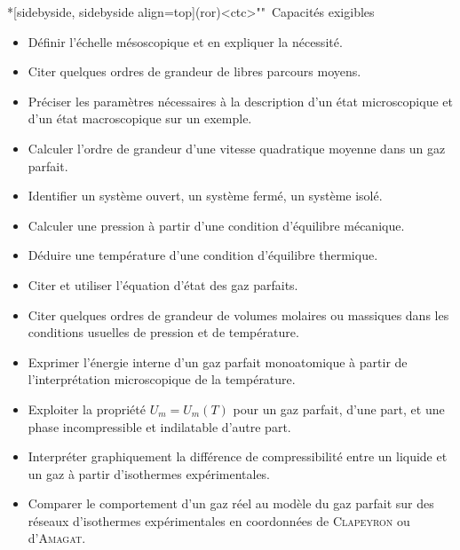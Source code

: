 \documentclass[../../main/main.tex]{subfiles}
\begin{document}
\begin{tcn}*[sidebyside, sidebyside align=top](ror)<ctc>""{\iconhow~Capacités exigibles}
	\small
	\begin{itemize}[label=\rcheck]
		\item Définir l'échelle mésoscopique et en expliquer la nécessité.
		\item Citer quelques ordres de grandeur de libres parcours moyens.
		\item Préciser les paramètres nécessaires à la description d'un état
		      microscopique et d'un état macroscopique sur un exemple.
		\item Calculer l'ordre de grandeur d'une vitesse quadratique moyenne dans un
		      gaz parfait.
		\item Identifier un système ouvert, un système fermé, un système isolé.
		\item Calculer une pression à partir d'une condition d'équilibre mécanique.
		\item Déduire une température d'une condition d'équilibre thermique.
		\item Citer et utiliser l'équation d'état des gaz parfaits.
	\end{itemize}
	\tcblower
	\small
	\begin{itemize}[label=\rcheck]
		\item Citer quelques ordres de grandeur de volumes molaires ou massiques
		      dans les conditions usuelles de pression et de température.
		\item Exprimer l'énergie interne d'un gaz parfait monoatomique à partir de
		      l'interprétation microscopique de la température.
		\item Exploiter la propriété $U_m = U_m(T)$ pour un gaz parfait, d'une part,
		      et une phase incompressible et indilatable d'autre part.
		\item Interpréter graphiquement la différence de compressibilité entre un
		      liquide et un gaz à partir d'isothermes expérimentales.
		\item Comparer le comportement d'un gaz réel au modèle du gaz parfait sur
		      des réseaux d'isothermes expérimentales en coordonnées de
		      \textsc{Clapeyron} ou d'\textsc{Amagat}.
	\end{itemize}
\end{tcn}
\vspace{-15pt}
\end{document}
